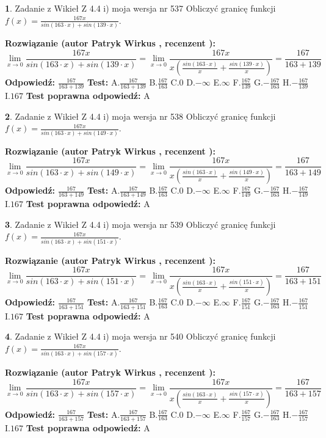 \documentclass[12pt, a4paper]{article}
\theoremstyle{definition} %
\newtheorem{zad}{}
\newcommand{\zadStart}[1]{\begin{zad}#1\newline}
\newcommand{\zadStop}{\end{zad}}
\newcommand{\rozwStart}[2]{\noindent \textbf{Rozwiązanie (autor #1 , recenzent #2): }\newline}
\newcommand{\rozwStop}{\newline}
\newcommand{\odpStart}{\noindent \textbf{Odpowiedź:}\newline}
\newcommand{\odpStop}{\newline}
\newcommand{\testStart}{\noindent \textbf{Test:}\newline}
\newcommand{\testStop}{\newline}
\newcommand{\kluczStart}{\noindent \textbf{Test poprawna odpowiedź:}\newline}
\newcommand{\kluczStop}{\newline}
\begin{document}
\zadStart{Zadanie z Wikieł Z 4.4 i) moja wersja nr 537}
Obliczyć granicę funkcji $f(x)=\frac{167x}{sin(163\cdot x) +sin(139\cdot x)}$.
\zadStop
\rozwStart{Patryk Wirkus}{}
$$\lim\limits_{x\to 0}\frac{167x}{sin(163\cdot x) +sin(139\cdot x)}=\lim\limits_{x\to 0}\frac{167x}{x(\frac{sin(163\cdot x)}{x}+\frac{sin(139\cdot x)}{x})}=\frac{167}{163+139}$$
\rozwStop
\odpStart
$\frac{167}{163+139}$
\odpStop
\testStart
A.$\frac{167}{163+139}$
B.$\frac{167}{163}$
C.$0$
D.$-\infty$
E.$\infty$
F.$\frac{167}{139}$
G.$-\frac{167}{163}$
H.$-\frac{167}{139}$
I.$167$
\testStop
\kluczStart
A
\kluczStop



\zadStart{Zadanie z Wikieł Z 4.4 i) moja wersja nr 538}
Obliczyć granicę funkcji $f(x)=\frac{167x}{sin(163\cdot x) +sin(149\cdot x)}$.
\zadStop
\rozwStart{Patryk Wirkus}{}
$$\lim\limits_{x\to 0}\frac{167x}{sin(163\cdot x) +sin(149\cdot x)}=\lim\limits_{x\to 0}\frac{167x}{x(\frac{sin(163\cdot x)}{x}+\frac{sin(149\cdot x)}{x})}=\frac{167}{163+149}$$
\rozwStop
\odpStart
$\frac{167}{163+149}$
\odpStop
\testStart
A.$\frac{167}{163+149}$
B.$\frac{167}{163}$
C.$0$
D.$-\infty$
E.$\infty$
F.$\frac{167}{149}$
G.$-\frac{167}{163}$
H.$-\frac{167}{149}$
I.$167$
\testStop
\kluczStart
A
\kluczStop



\zadStart{Zadanie z Wikieł Z 4.4 i) moja wersja nr 539}
Obliczyć granicę funkcji $f(x)=\frac{167x}{sin(163\cdot x) +sin(151\cdot x)}$.
\zadStop
\rozwStart{Patryk Wirkus}{}
$$\lim\limits_{x\to 0}\frac{167x}{sin(163\cdot x) +sin(151\cdot x)}=\lim\limits_{x\to 0}\frac{167x}{x(\frac{sin(163\cdot x)}{x}+\frac{sin(151\cdot x)}{x})}=\frac{167}{163+151}$$
\rozwStop
\odpStart
$\frac{167}{163+151}$
\odpStop
\testStart
A.$\frac{167}{163+151}$
B.$\frac{167}{163}$
C.$0$
D.$-\infty$
E.$\infty$
F.$\frac{167}{151}$
G.$-\frac{167}{163}$
H.$-\frac{167}{151}$
I.$167$
\testStop
\kluczStart
A
\kluczStop



\zadStart{Zadanie z Wikieł Z 4.4 i) moja wersja nr 540}
Obliczyć granicę funkcji $f(x)=\frac{167x}{sin(163\cdot x) +sin(157\cdot x)}$.
\zadStop
\rozwStart{Patryk Wirkus}{}
$$\lim\limits_{x\to 0}\frac{167x}{sin(163\cdot x) +sin(157\cdot x)}=\lim\limits_{x\to 0}\frac{167x}{x(\frac{sin(163\cdot x)}{x}+\frac{sin(157\cdot x)}{x})}=\frac{167}{163+157}$$
\rozwStop
\odpStart
$\frac{167}{163+157}$
\odpStop
\testStart
A.$\frac{167}{163+157}$
B.$\frac{167}{163}$
C.$0$
D.$-\infty$
E.$\infty$
F.$\frac{167}{157}$
G.$-\frac{167}{163}$
H.$-\frac{167}{157}$
I.$167$
\testStop
\kluczStart
A
\kluczStop
\end{document}
